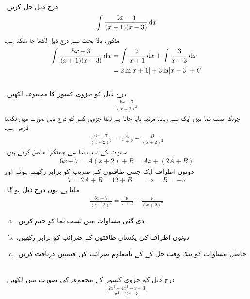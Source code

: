 \\
درج ذیل حل کریں۔
\begin{align*}
\int \frac{5x-3}{(x+1)(x-3)}\dif x
\end{align*}
مذکورہ بالا  بحث سے درج ذیل  لکھا جا  سکتا  ہے۔
\begin{align*}
\int\frac{5x-3}{(x+1)(x-3)}\dif x&=\int \frac{2}{x+1}\dif x+\int\frac{3}{x-3}\dif x\\
&=2\ln\abs{x+1}+3\ln\abs{x-3}+C
\end{align*}
\\
درج ذیل کو جزوی کسور کا مجموعہ لکھیں۔
\begin{align*}
\frac{6x+7}{(x+2)^2}
\end{align*} 
چونکہ نسب نما میں  ایک سے زیادہ مرتبہ پایا جاتا ہے لہٰذا جزوی کسر کو درج ذیل صورت میں لکھنا لازمی ہے۔
\begin{align}\label{مساوات_طریقہ_جزوی_کسر_دہراتا_الف}
\frac{6x+7}{(x+2)^2}=\frac{A}{x+2}+\frac{B}{(x+2)^2}
\end{align}
مساوات  کے نسب نما سے چھٹکارا حاصل کرتے ہیں۔
\begin{align*}
6x+7=A(x+2)+B=Ax+(2A+B)
\end{align*} 
دونوں اطراف ایک  جتنی طاقتوں کے   ضریب  کو برابر  رکھتے ہوئے   اور 
\begin{align*}
7=2A+B=12+B,\quad \implies \quad B=-5
\end{align*}
ملتا ہے۔یوں درج ذیل ہو گا۔
\begin{align*}
\frac{6x+7}{(x+2)^2}=\frac{6}{x+2}-\frac{5}{(x+2)^2}
\end{align*}
\begin{enumerate}[a.]
\item
دی گئی مساوات میں نسب نما کو ختم کریں۔
\item
دونوں اطراف  کی  یکساں طاقتوں کے  ضرائب  کو برابر رکھیں۔
\item
حاصل مساوات کو بیک وقت حل  کے کے نامعلوم ضرائب   کی قیمتیں دریافت کریں۔ 
\end{enumerate}

\\
درج ذیل کو جزوی کسور  کے مجموعہ کی صورت میں لکھیں۔
\begin{align*}
\frac{2x^3-4x^2-x-3}{x^2-2x-3}
\end{align*}

